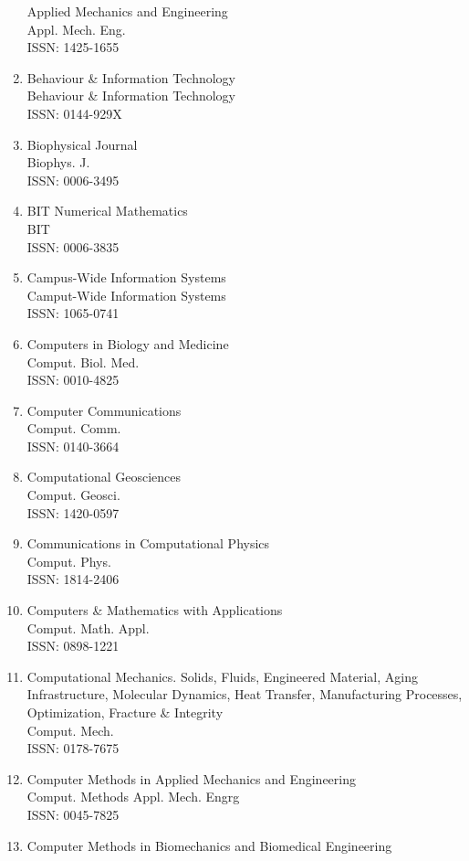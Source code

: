 \begin{enumerate}
 Applied Mechanics and Engineering\\
 Appl. Mech. Eng.\\
 ISSN: 1425-1655
\item
 Behaviour \& Information Technology\\
 Behaviour \& Information Technology\\
 ISSN: 0144-929X
\item
 Biophysical Journal\\
 Biophys. J.\\
 ISSN: 0006-3495
\item
 BIT Numerical Mathematics\\
 BIT\\
 ISSN: 0006-3835
\item
 Campus-Wide Information Systems\\
 Camput-Wide Information Systems\\
 ISSN: 1065-0741
\item
 Computers in Biology and Medicine\\
 Comput. Biol. Med.\\
 ISSN: 0010-4825
\item
 Computer Communications\\
 Comput. Comm.\\
 ISSN: 0140-3664
\item
 Computational Geosciences\\
 Comput. Geosci.\\
 ISSN: 1420-0597
\item
 Communications in Computational Physics\\
 Comput. Phys.\\
 ISSN: 1814-2406
\item
 Computers \& Mathematics with Applications\\
 Comput. Math. Appl.\\
 ISSN: 0898-1221
\item
 Computational Mechanics. Solids, Fluids, Engineered Material, Aging Infrastructure, Molecular Dynamics, Heat Transfer, Manufacturing Processes, Optimization, Fracture \& Integrity\\
 Comput. Mech.\\
 ISSN: 0178-7675
\item
 Computer Methods in Applied Mechanics and Engineering\\
 Comput. Methods Appl. Mech. Engrg\\
 ISSN: 0045-7825
\item
 Computer Methods in Biomechanics and Biomedical Engineering\\

\end{enumerate}
